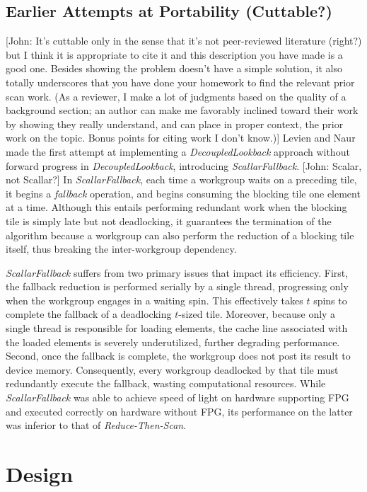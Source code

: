 \documentclass[sigconf]{acmart}
\newcommand{\john}[1]{{\footnotesize\color{cyan}[John: #1]}}
\begin{document}
\subsection{Earlier Attempts at Portability (Cuttable?)}
\john{It's cuttable only in the sense that it's not peer-reviewed literature (right?) but I think it is appropriate to cite it and this description you have made is a good one. Besides showing the problem doesn't have a simple solution, it also totally underscores that you have done your homework to find the relevant prior scan work. (As a reviewer, I make a lot of judgments based on the quality of a background section; an author can make me favorably inclined toward their work by showing they really understand, and can place in proper context, the prior work on the topic. Bonus points for citing work I don't know.)}
Levien and Naur~\cite{} made the first attempt at implementing a \emph{DecoupledLookback} approach without forward progress in \emph{DecoupledLookback}, introducing \emph{ScallarFallback}. \john{Scalar, not Scallar?} In \emph{ScallarFallback}, each time a workgroup waits on a preceding tile, it begins a \emph{fallback} operation, and begins consuming the blocking tile one element at a time. Although this entails performing redundant work when the blocking tile is simply late but not deadlocking, it guarantees the termination of the algorithm because a workgroup can also perform the reduction of a blocking tile itself, thus breaking the inter-workgroup dependency.

\emph{ScallarFallback} suffers from two primary issues that impact its efficiency. First, the fallback reduction is performed serially by a single thread, progressing only when the workgroup engages in a waiting spin. This effectively takes $t$ spins to complete the fallback of a deadlocking $t$-sized tile. Moreover, because only a single thread is responsible for loading elements, the cache line associated with the loaded elements is severely underutilized, further degrading performance. Second, once the fallback is complete, the workgroup does not post its result to device memory. Consequently, every workgroup deadlocked by that tile must redundantly execute the fallback, wasting computational resources. While \emph{ScallarFallback} was able to achieve speed of light on hardware supporting FPG and executed correctly on hardware without FPG, its performance on the latter was inferior to that of \emph{Reduce-Then-Scan}.

\section{Design}
\end{document}

